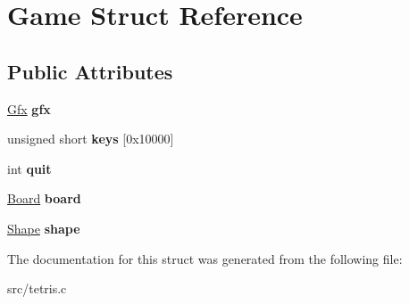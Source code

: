 \hypertarget{structGame}{}\section{Game Struct Reference}
\label{structGame}
\subsection*{Public Attributes}
\begin{DoxyCompactItemize}
\item 
\mbox{\label{structGame_a82d261ce9cc6171eea8a3d79ede4c4ce}} 
\hyperlink{structGfx}{Gfx} {\bfseries gfx}
\item 
\mbox{\label{structGame_a3ea3a66e9b7b5351f05be6246c4b4fa1}} 
unsigned short {\bfseries keys} \mbox{[}0x10000\mbox{]}
\item 
\mbox{\label{structGame_ad71cbec42c9521b5ac44247e7cae543a}} 
int {\bfseries quit}
\item 
\mbox{\label{structGame_af5bc546b0c766ecf2f7e008f750832ed}} 
\hyperlink{structBoard}{Board} {\bfseries board}
\item 
\mbox{\label{structGame_a9f9e0c9cf34eaecf1fba5a271150bb68}} 
\hyperlink{structShape}{Shape} {\bfseries shape}
\end{DoxyCompactItemize}


The documentation for this struct was generated from the following file\+:\begin{DoxyCompactItemize}
\item 
src/tetris.\+c\end{DoxyCompactItemize}
